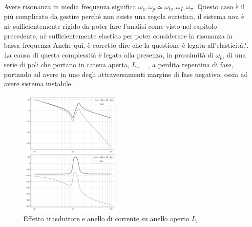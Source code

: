 Avere risonanza in media frequenza significa \(\omega_z,\omega_p \simeq \omega_{tv},\omega_I,\omega_\pi\). Questo caso è il più complicato da gestire perché non esiste una regola euristica, il sistema non è nè sufficientemente rigido da poter fare l'analisi come visto nel capitolo precedente, nè sufficientemente elastico per poter considerare la risonanza in bassa frequenza {\color{red}Anche qui, è corretto dire che la questione è legata all'elasticità?}.
La causa di questa complessità è legata alla presenza, in prossimità di \(\omega_p\), di una serie di poli che portano in catena aperta, \(L_v = \), a perdita repentina di fase, portando ad avere in uno degli attraversamenti margine di fase negativo, ossia ad avere sistema instabile.

\begin{figure}[h]
    \centering
    \includegraphics[width=0.45\textwidth]{Immagini/risonanza_media_f_Gvm_vs_Lv.png}
    \caption{Effetto trasduttore e anello di corrente su anello aperto \(L_v\)}
\end{figure}


